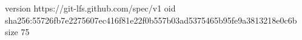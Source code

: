 version https://git-lfs.github.com/spec/v1
oid sha256:55726fb7e2275607ec416f81e22f0b557b03ad5375465b95fe9a3813218e0c6b
size 75
